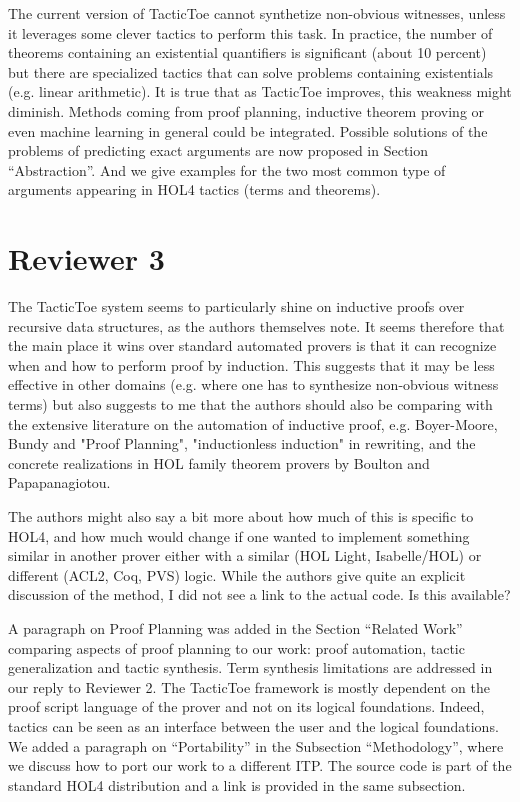 \documentclass[]{scrartcl}
\begin{document}
The current version of TacticToe cannot synthetize non-obvious 
witnesses, unless it leverages some clever 
tactics to perform this task. In practice, the number of theorems containing 
an existential quantifiers is significant (about 10 percent) but there are 
specialized tactics that can solve problems containing existentials (e.g. 
linear arithmetic). It is true that as TacticToe improves, this weakness 
might diminish. Methods coming from proof planning, inductive 
theorem proving or even machine learning in general could be integrated.
Possible solutions of the problems of predicting exact arguments are now 
proposed in Section ``Abstraction''. And we give examples for the two most 
common type of arguments appearing in HOL4 tactics (terms and theorems).

\section*{Reviewer 3}

\begin{leftbar}
The TacticToe system seems to particularly shine on inductive proofs over
recursive data structures, as the authors themselves note. It seems
therefore that the main place it wins over standard automated provers is
that it can recognize when and how to perform proof by induction. This
suggests that it may be less effective in other domains (e.g. where one has
to synthesize non-obvious witness terms) but also suggests to me that the
authors should also be comparing with the extensive literature on the
automation of inductive proof, e.g. Boyer-Moore, Bundy and "Proof
Planning", "inductionless induction" in rewriting, and the concrete
realizations in HOL family theorem provers by Boulton and Papapanagiotou.

The authors might also say a bit more about how much of this is specific to
HOL4, and how much would change if one wanted to implement something
similar in another prover either with a similar (HOL Light, Isabelle/HOL)
or different (ACL2, Coq, PVS) logic. While the authors give quite an
explicit discussion of the method, I did not see a link to the actual code.
Is this available?
\end{leftbar}

A paragraph on Proof Planning was added in the Section ``Related Work'' 
comparing aspects of proof planning to our work: proof automation, tactic 
generalization and tactic synthesis. Term synthesis limitations are
addressed in our reply to Reviewer 2.
The TacticToe framework is mostly dependent on the proof script language of the 
prover and not on its logical foundations. Indeed, tactics can be seen as an 
interface between the user and the logical foundations. We added a 
paragraph on ``Portability'' in the Subsection ``Methodology'', where we 
discuss how to port our work to a different ITP. The source code is part of the 
standard HOL4 distribution and a link is provided in the same subsection.
\end{document}
